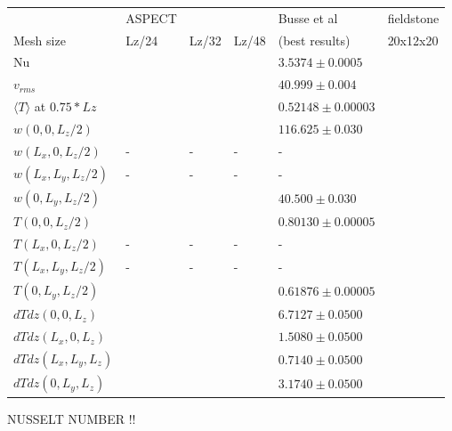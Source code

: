\begin{tabular}{llllll}
\hline
                                & ASPECT &       &       & Busse et al \cite{bucc93} & fieldstone \\
Mesh size                       & Lz/24  & Lz/32 & Lz/48 & (best results)            & 20x12x20    \\
\hline
Nu                              &  & &  & $3.5374  \pm 0.0005$   \\
$v_{rms}$                       &  & &  & $40.999  \pm 0.004$    \\
$\langle T\rangle$ at $0.75*Lz$ &  & &  & $0.52148 \pm 0.00003$  \\
$w(0,0,L_z/2)$     &  &&& $116.625 \pm 0.030$ \\
$w(L_x,0,L_z/2)$   & - &-&-& -\\
$w(L_x,L_y,L_z/2)$ & - &-&-& -\\
$w(0,L_y,L_z/2)$   &  &&& $40.500 \pm 0.030$ \\
$T(0,0,L_z/2)$     &  &&& $0.80130 \pm 0.00005$ \\
$T(L_x,0,L_z/2)$   &  -&-&-& -\\
$T(L_x,L_y,L_z/2)$ &  -&-&-& -\\
$T(0,L_y,L_z/2)$   &  &&& $0.61876 \pm 0.00005$ \\
$dTdz(0,0,L_z)$    &  &&& $6.7127 \pm 0.0500$ \\
$dTdz(L_x,0,L_z)$  &  &&& $1.5080 \pm 0.0500$ \\
$dTdz(L_x,L_y,L_z)$&  &&& $0.7140 \pm 0.0500$ \\
$dTdz(0,L_y,L_z)$  &  &&& $3.1740 \pm 0.0500$ \\
\hline
\end{tabular}




NUSSELT NUMBER !!

